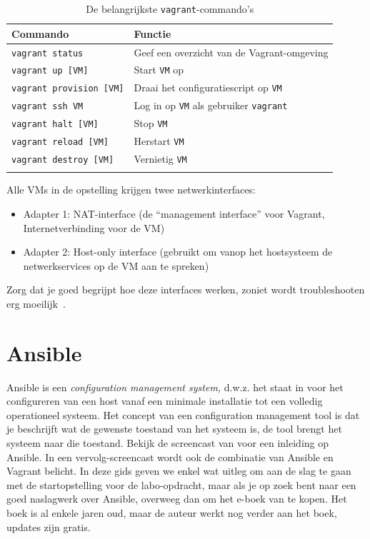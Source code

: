 \begin{longtable}{@{}ll@{}}
  \toprule
  Commando & Functie\tabularnewline
  \midrule
  \endhead
  \texttt{vagrant\ status} & Geef een overzicht van de Vagrant-omgeving\tabularnewline
  \texttt{vagrant\ up\ [VM]} & Start \texttt{VM} op\tabularnewline
  \texttt{vagrant\ provision\ [VM]} & Draai het configuratiescript op \texttt{VM}\tabularnewline
  \texttt{vagrant\ ssh\ VM} & Log in op \texttt{VM} als gebruiker \texttt{vagrant}\tabularnewline
  \texttt{vagrant\ halt\ [VM]} & Stop \texttt{VM}\tabularnewline
  \texttt{vagrant\ reload\ [VM]} & Herstart \texttt{VM}\tabularnewline
  \texttt{vagrant\ destroy\ [VM]} & Vernietig \texttt{VM}\tabularnewline
  \bottomrule
\caption{De belangrijkste \texttt{vagrant}-commando's}
\label{tab:vagrant-commandos}
\end{longtable}

Alle VMs in de opstelling krijgen twee netwerkinterfaces:

\begin{itemize}
  \item Adapter 1: NAT-interface (de ``management interface'' voor Vagrant, Internetverbinding voor de VM)
  \item Adapter 2: Host-only interface (gebruikt om vanop het hostsysteem de netwerkservices op de VM aan te spreken)
\end{itemize}

Zorg dat je goed begrijpt hoe deze interfaces werken, zoniet wordt troubleshooten erg moeilijk~\autocite{VanVreckem2015a}.

\section{Ansible}
\label{sec:ansible}

Ansible is een \emph{configuration management system,} d.w.z. het staat in voor het configureren van een host vanaf een minimale installatie tot een volledig operationeel systeem. Het concept van een configuration management tool is dat je beschrijft wat de gewenste toestand van het systeem is, de tool brengt het systeem naar die toestand. Bekijk de screencast van \textcite{Weissig2015} voor een inleiding op Ansible. In een vervolg-screencast wordt ook de combinatie van Ansible en Vagrant belicht. In deze gids geven we enkel wat uitleg om aan de slag te gaan met de startopstelling voor de labo-opdracht, maar als je op zoek bent naar een goed naslagwerk over Ansible, overweeg dan om het e-boek van \textcite{Geerling2016} te kopen. Het boek is al enkele jaren oud, maar de auteur werkt nog verder aan het boek, updates zijn gratis.

